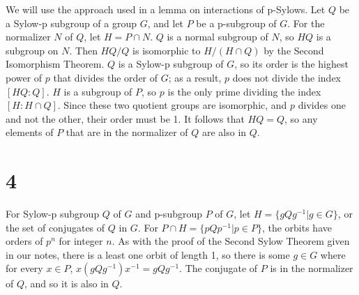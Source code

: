 \documentclass{article}
\begin{document}
We will use the approach used in a lemma on interactions of p-Sylows.  
Let $Q$ be a Sylow-p subgroup of a group $G$, and let $P$ be a p-subgroup of $G$.  
For the normalizer $N$ of $Q$, let $H = P \cap N$.  $Q$ is a normal subgroup of $N$, 
so $HQ$ is a subgroup on $N$.  Then $HQ/Q$ is isomorphic to $H/(H \cap Q)$ by the 
Second Isomorphism Theorem.  $Q$ is a Sylow-p subgroup of $G$, so its order 
is the highest power of $p$ that divides the order of $G$; as a result, $p$ does 
not divide the index $[HQ:Q]$.  $H$ is a subgroup of $P$, so $p$ is the only prime 
dividing the index $[H:H \cap Q]$.  Since these two quotient groups are isomorphic, 
and $p$ divides one and not the other, their order must be 1.  It follows that $HQ = Q$, 
so any elements of $P$ that are in the normalizer of $Q$ are also in $Q$.

\newpage

\section*{4}

For Sylow-p subgroup $Q$ of $G$ and p-subgroup $P$ of $G$, let $H = \{gQg^{-1} | g \in G\}$, 
or the set of conjugates of $Q$ in $G$.  For $P \cap H = \{pQp^{-1} | p \in P \}$, 
the orbits have orders of $p^n$ for integer $n$.  As with the proof of the Second 
Sylow Theorem given in our notes, there is a least one orbit of length 1, so there is 
some $g \in G$ where for every $x \in P$, $x(gQg^{-1})x^{-1} = gQg^{-1}$.  
The conjugate of $P$ is in the normalizer of $Q$, and so it is also in $Q$.
\end{document}

